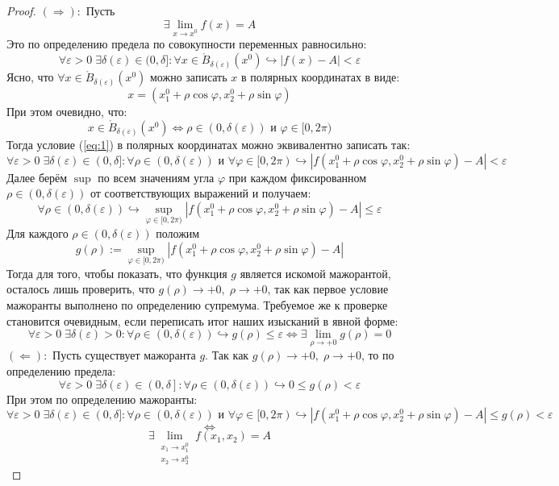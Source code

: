 \documentclass[11pt]{article}
\begin{document}
\begin{proof}
    $(\Longrightarrow):$ Пусть
    \[\exists \lim_{x \to x^0} f(x) = A\]
    Это по определению предела по совокупности переменных равносильно:
    \begin{equation*} \label{eq:1} \tag{$\ast$}
        \forall \varepsilon > 0 \; \exists \delta(\varepsilon) \in (0, \delta]: \forall x \in \mathring{B}_{\delta(\varepsilon)}\left(x^0\right) \hookrightarrow \left\lvert f(x) - A \right\rvert < \varepsilon
    \end{equation*}
    Ясно, что $\forall x \in \mathring{B}_{\delta(\varepsilon)}\left(x^0\right)$ можно записать $x$ в полярных координатах в виде:
    \[x = \left(x_1^0 + \rho \cos \varphi, x_2^0 + \rho \sin \varphi \right)\]
    При этом очевидно, что:
    \[x \in \mathring{B}_{\delta(\varepsilon)}\left(x^0\right) \iff \rho \in \left(0, \delta(\varepsilon)\right) \text{ и } \varphi \in [0, 2 \pi)\]
    Тогда условие (\ref{eq:1}) в полярных координатах можно эквивалентно записать так:
    \[\forall \varepsilon > 0 \; \exists \delta(\varepsilon) \in (0, \delta]: \forall \rho \in \left(0, \delta(\varepsilon)\right) \text{ и } \forall \varphi \in [0, 2 \pi) \hookrightarrow 
    \left\lvert f\left(x_1^0 + \rho \cos \varphi, x_2^0 + \rho \sin \varphi \right) - A\right\rvert < \varepsilon\]
    Далее берём $\sup$ по всем значениям угла $\varphi$ при каждом фиксированном $\rho \in \left(0, \delta(\varepsilon)\right)$ от соответствующих выражений и получаем:
    \[\forall \rho \in \left(0, \delta(\varepsilon)\right) \hookrightarrow \sup_{\varphi \in [0, 2 \pi)} \left\lvert f\left(x_1^0 + \rho \cos \varphi, x_2^0 + \rho \sin \varphi \right) - A\right\rvert \leq \varepsilon \]
    Для каждого $\rho \in \left(0, \delta(\varepsilon)\right)$ положим
    \[g(\rho) := \sup_{\varphi \in [0, 2 \pi)} \left\lvert f\left(x_1^0 + \rho \cos \varphi, x_2^0 + \rho \sin \varphi \right) - A\right\rvert\]
    Тогда для того, чтобы показать, что функция $g$ является искомой мажорантой, осталось лишь проверить, что $g(\rho) \to +0, \; \rho \to +0$, так как 
    первое условие мажоранты выполнено по определению супремума. Требуемое же к проверке становится очевидным, если переписать итог наших изысканий в явной форме:
    \[\forall \varepsilon > 0 \; \exists \delta(\varepsilon) > 0: \forall \rho \in \left(0, \delta(\varepsilon)\right) \hookrightarrow g(\rho) \leq \varepsilon \iff \exists \lim_{\rho \to +0} g(\rho) = 0\]
    $(\Longleftarrow):$ Пусть существует мажоранта $g$. Так как $g(\rho) \to +0, \; \rho \to +0$, то по определению предела:
    \[\forall \varepsilon > 0 \; \exists \delta(\varepsilon) \in \left(0, \delta\right]: \forall \rho \in \left(0, \delta(\varepsilon)\right) \hookrightarrow 0 \leq g(\rho) < \varepsilon\]
    При этом по определению мажоранты:
    \[\forall \varepsilon > 0 \; \exists \delta(\varepsilon) \in (0, \delta]: \forall \rho \in \left(0, \delta(\varepsilon)\right) \text{ и } \forall \varphi \in [0, 2 \pi) \hookrightarrow 
    \left\lvert f\left(x_1^0 + \rho \cos \varphi, x_2^0 + \rho \sin \varphi \right) - A\right\rvert \leq g(\rho) < \varepsilon\]
    \[\iff\]
    \[\exists \lim\limits_{\substack{x_1 \to x_1^0 \\ x_2 \to x_2^0}} f(x_1, x_2) = A\]
\end{proof}
\end{document}
